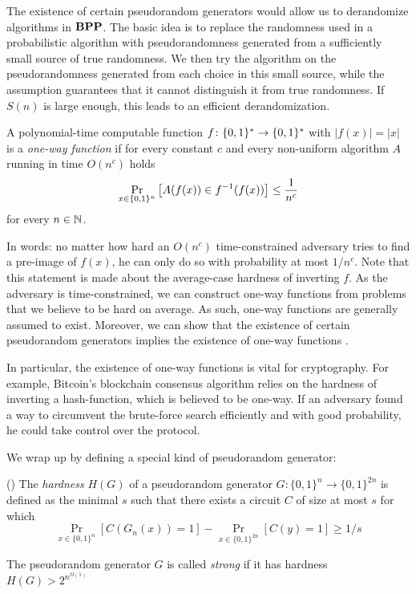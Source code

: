 \documentclass[11pt]{article}
\begin{document}
The existence of certain pseudorandom generators would allow us to
derandomize algorithms in $\mathbf{BPP}$. The basic idea is to replace the randomness
used in a probabilistic algorithm with pseudorandomness generated from a
sufficiently small source of true randomness. We then try the algorithm on the
pseudorandomness generated from each choice in this small source, while the
assumption guarantees that it cannot distinguish it from true randomness.
If $S(n)$ is large enough, this leads to an efficient derandomization.

\begin{definition}
  A polynomial-time computable
  function $f \colon \{0,1\}^* \to \{0,1\}^*$ with 
  $|f(x)| = |x|$
  is a \emph{one-way function}
  if for every constant $c$ and every non-uniform algorithm $A$ running in
  time $O(n^c)$ holds
  \[
    \Pr_{x \in \{0,1\}^n}\left[A(f(x)) \in f^{-1}(f(x))\right] \le \frac 1 {n^c}
  \]
  for every $n \in {\mathbb{N}}$.
\end{definition}

In words: no matter how hard an $O(n^c)$ time-constrained adversary tries to
find a pre-image of $f(x)$, he can only do so with probability at most
$1 / n^c$.
Note that this statement is made about the average-case hardness of inverting
$f$. As the adversary is time-constrained, we can construct one-way
functions from problems that we believe to be hard on average.
%
As such, one-way functions are generally assumed to exist.
Moreover, we can show that the existence of certain pseudorandom generators
implies the existence of one-way functions \cite{hastad99}.
%

In particular,
the existence of one-way functions is vital for cryptography. For example,
Bitcoin's blockchain consensus algorithm relies on the hardness of inverting
a hash-function, which is believed to be one-way.
If an adversary found a way to circumvent the brute-force search
efficiently and with good probability, he could take control over the protocol.
%

We wrap up by defining a special kind of pseudorandom generator:

\begin{definition}(\cite{10.1145/335305.335314})
	The \textit{hardness} $H(G)$ of a pseudorandom generator $G: \{0, 1\}^n \rightarrow \{0, 1\}^{2n}$ is defined as the minimal $s$ such that there exists a circuit $C$ of size at most $s$ for which
	\[\Pr_{x \in \{0, 1\}^n}[C(G_n(x)) = 1] - \Pr_{x \in \{0, 1\}^{2n}}[C(y) = 1] \geq 1/s\]
	
	The pseudorandom generator $G$ is called \textit{strong} if it has hardness $H(G) > 2^{n^{\Omega(1)}}$ 
\end{definition}
\end{document}
